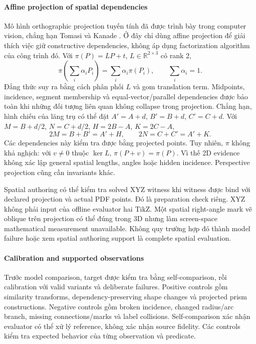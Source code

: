 \documentclass[a4paper,12pt]{article}
\begin{document}
\paragraph{Affine projection of spatial dependencies}
Mô hình orthographic projection tuyến tính đã được trình bày trong computer vision, chẳng hạn Tomasi và Kanade \cite{tomasi1992}. Ở đây chỉ dùng affine projection để giải thích việc giữ constructive dependencies, không áp dụng factorization algorithm của công trình đó. Với $\pi(P)=LP+t$, $L\in\mathbb R^{2\times3}$ có rank 2,
\begin{equation}
\pi\!\left(\sum_i\alpha_iP_i\right)
=\sum_i\alpha_i\pi(P_i),\qquad \sum_i\alpha_i=1.
\end{equation}
Đẳng thức suy ra bằng cách phân phối $L$ và gom translation term. Midpoints, incidence, segment membership và equal-vector/parallel dependencies được bảo toàn khi những đối tượng liên quan không collapse trong projection. Chẳng hạn, hình chiếu của lăng trụ có thể đặt $A'=A+d$, $B'=B+d$, $C'=C+d$. Với $M=B+d/2$, $N=C+d/2$, $H=2B-A$, $K=2C-A$,
\begin{equation}
2M=B+B'=A'+H,\qquad 2N=C+C'=A'+K.
\end{equation}
Các dependencies này kiểm tra được bằng projected points. Tuy nhiên, $\pi$ không khả nghịch: với $v\ne0$ thuộc $\ker L$, $\pi(P+v)=\pi(P)$. Vì thế 2D evidence không xác lập general spatial lengths, angles hoặc hidden incidence. Perspective projection cũng cần invariants khác.

Spatial authoring có thể kiểm tra solved XYZ witness khi witness được bind với declared projection và actual PDF points. Đó là preparation check riêng. XYZ không phải input của offline evaluator hai TikZ. Một spatial right-angle mark vẽ oblique trên projection có thể đúng trong 3D nhưng làm screen-space mathematical measurement unavailable. Không quy trường hợp đó thành model failure hoặc xem spatial authoring support là complete spatial evaluation.

\paragraph{Calibration and supported observations}
Trước model comparison, target được kiểm tra bằng self-comparison, rồi calibration với valid variants và deliberate failures. Positive controls gồm similarity transforms, dependency-preserving shape changes và projected prism constructions. Negative controls gồm broken incidence, changed radius/arc branch, missing connections/marks và label collisions. Self-comparison xác nhận evaluator có thể xử lý reference, không xác nhận source fidelity. Các controls kiểm tra expected behavior của từng observation và predicate.
\end{document}

